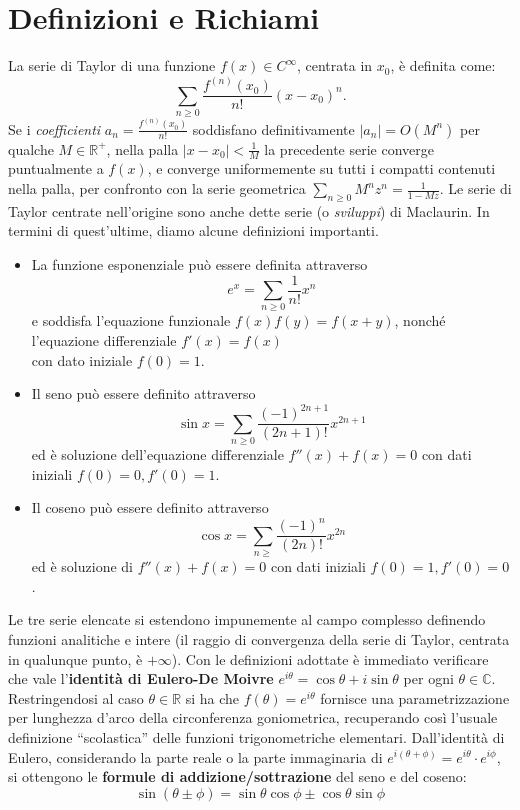 \documentclass[a4paper,twoside]{article}
\newcommand{\C}{\mathbb{C}}
\newcommand{\R}{\mathbb{R}}
\theoremstyle{definition}
\numberwithin{theorem}{section}
\begin{document}
\section{Definizioni e Richiami}
La serie di Taylor di una funzione $f(x)\in C^{\infty}$, centrata in $x_0$, è definita come:
$$\sum_{n\geq 0}^{}\frac{f^{(n)}(x_0)}{n!}(x-x_0)^n.$$
Se i \emph{coefficienti} $a_n=\frac{f^{(n)}(x_0)}{n!}$ soddisfano definitivamente $|a_n|=O(M^n)$ per qualche $M\in\R^+$, nella palla $|x-x_0|<\frac{1}{M}$ la precedente serie converge puntualmente a $f(x)$, e converge uniformemente su tutti i compatti contenuti nella palla, per confronto con la serie geometrica $\sum_{n\geq 0}M^n z^n = \frac{1}{1-Mz}$. Le serie di Taylor centrate nell'origine sono anche dette serie (o \emph{sviluppi}) di Maclaurin. In termini di quest'ultime, diamo alcune definizioni importanti.
\begin{itemize}
\item La funzione esponenziale può essere definita attraverso $$e^x=\sum_{n\geq 0}\frac{1}{n!}x^n$$ 
e soddisfa l'equazione funzionale $f(x)f(y)=f(x+y)$, nonché l'equazione differenziale $f'(x)=f(x)$\\ con dato iniziale $f(0)=1$.
\item Il seno può essere definito attraverso $$\sin x = \sum_{n\geq 0}\frac{(-1)^{2n+1}}{(2n+1)!}x^{2n+1}$$
ed è soluzione dell'equazione differenziale $f''(x)+f(x)=0$ con dati iniziali $f(0)=0, f'(0)=1$.
\item Il coseno può essere definito attraverso $$\cos x = \sum_{n\geq }\frac{(-1)^n}{(2n)!}x^{2n}$$
ed è soluzione di $f''(x)+f(x)=0$ con dati iniziali $f(0)=1, f'(0)=0$.
\end{itemize}
Le tre serie elencate si estendono impunemente al campo complesso definendo funzioni analitiche e intere (il raggio di convergenza della serie di Taylor, centrata in qualunque punto, è $+\infty$). Con le definizioni adottate è immediato verificare che vale l'\textbf{identità di Eulero-De Moivre} $e^{i\theta}=\cos\theta+i\sin\theta$ per ogni $\theta\in\C$. Restringendosi al caso $\theta\in\R$ si ha che $f(\theta)=e^{i\theta}$ fornisce una parametrizzazione per lunghezza d'arco della circonferenza goniometrica, recuperando così l'usuale definizione ``scolastica'' delle funzioni trigonometriche elementari. Dall'identità di Eulero, considerando la parte reale o la parte immaginaria di $e^{i(\theta+\phi)}=e^{i\theta}\cdot e^{i\phi}$, si ottengono le \textbf{formule di addizione/sottrazione} del seno e del coseno:
$$ \sin(\theta\pm\phi)=\sin\theta\cos\phi \pm \cos\theta\sin\phi $$
\end{document}
